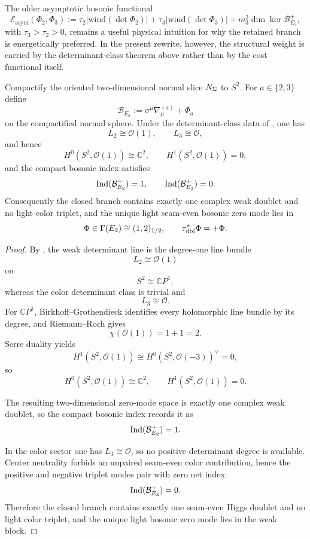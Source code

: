 \begin{remark}
The older asymptotic bosonic functional
\[
\mathcal E_{\mathrm{asym}}(\Phi_2,\Phi_3)
:=
\tau_2\bigl|\mathrm{wind}(\det\Phi_2)\bigr|
+\tau_3\bigl|\mathrm{wind}(\det\Phi_3)\bigr|
+m_3^2\dim\ker\mathcal B_{E_3}^+,
\]
with $\tau_3>\tau_2>0$, remains a useful physical intuition for why the retained branch is energetically preferred. In the present rewrite, however, the structural weight is carried by the determinant-class theorem above rather than by the cost functional itself.
\end{remark}

\begin{theorem}
\label{thm:callias-higgs-selection}
\label{thm:compact-higgs-unique}
\label{thm:compact-determinant-higgs-index}
Compactify the oriented two-dimensional normal slice $N_\Sigma$ to $S^2$. For $a\in\{2,3\}$
define
\[
\mathcal B_{E_a}:=\sigma^\mu\nabla^{(a)}_\mu+\Phi_a
\]
on the compactified normal sphere. Under the determinant-class data of
, one has
\[
L_2\cong\mathcal O(1),
\qquad
L_3\cong\mathcal O,
\]
and hence
\[
H^0(S^2,\mathcal O(1))\cong\mathbb C^2,
\qquad
H^1(S^2,\mathcal O(1))=0,
\]
and the compact bosonic index satisfies
\[
\operatorname{Ind}(\mathcal B_{E_2}^+)=1,
\qquad
\operatorname{Ind}(\mathcal B_{E_3}^+)=0.
\]
Consequently the closed branch contains exactly one complex weak doublet and no light color triplet,
and the unique light seam-even bosonic zero mode lies in
\[
\Phi\in\Gamma(E_2)\cong (1,2)_{1/2},
\qquad
\tau_{\mathrm{dbl}}^{\ast}\Phi=+\Phi.
\]
\end{theorem}

\begin{proof}
By , the weak determinant line is the degree-one line
bundle
\[
L_2\cong\mathcal O(1)
\]
on
\[
S^2\cong\mathbb CP^1,
\]
whereas the color determinant class is trivial and
\[
L_3\cong\mathcal O.
\]
For $\mathbb CP^1$, Birkhoff--Grothendieck identifies every holomorphic line bundle by its degree,
and Riemann--Roch gives
\[
\chi(\mathcal O(1))=1+1=2.
\]
Serre duality yields
\[
H^1(S^2,\mathcal O(1))
\cong
H^0(S^2,\mathcal O(-3))^\vee
=0,
\]
so
\[
H^0(S^2,\mathcal O(1))\cong\mathbb C^2,
\qquad
H^1(S^2,\mathcal O(1))=0.
\]

The resulting two-dimensional zero-mode space is exactly one complex weak doublet, so the compact
bosonic index records it as
\[
\operatorname{Ind}(\mathcal B_{E_2}^+)=1.
\]

In the color sector one has $L_3\cong\mathcal O$, so no positive determinant degree is available.
Center neutrality forbids an unpaired seam-even color contribution, hence the positive and negative
triplet modes pair with zero net index:
\[
\operatorname{Ind}(\mathcal B_{E_3}^+)=0.
\]
Therefore the closed branch contains exactly one seam-even Higgs doublet and no light color
triplet, and the unique light bosonic zero mode lies in the weak block.
\end{proof}

